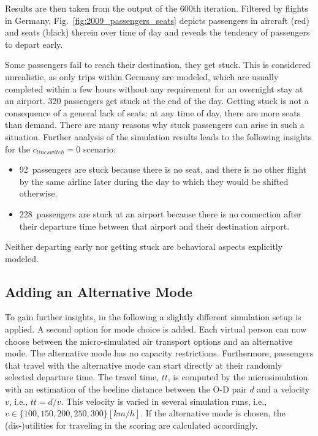 Results are then taken from the output of the 600th iteration. 
Filtered by flights in Germany, Fig.~\ref{fig:2009_passengers_seats} depicts passengers in aircraft (red) and seats (black) therein over time of day
and reveals the tendency of passengers to depart early. 

Some passengers fail to reach their destination, they get stuck.   
This is considered unrealistic, as only trips within Germany are modeled, which are usually completed within a few hours without any requirement for an overnight stay at an airport. 
320 passengers get stuck at the end of the day. 
Getting stuck is not a consequence of a general lack of seats: at any time of day, there are more seats than demand.  
There are many reasons why stuck passengers can arise in such a situation.
Further analysis of the simulation results leads to the following insights for the $c_{lineswitch} = 0$ scenario:
\begin{itemize}

\item 92~passengers are stuck because there is no seat, and there is no other flight by the same airline later during the day to which they would be shifted otherwise.

\item 228~passengers are stuck at an airport because there is no connection after their departure time 
	between that airport and their destination airport. 
\end{itemize}

Neither departing early nor getting stuck are behavioral aspects explicitly modeled.  

\subsection{Adding an Alternative Mode}

To gain further insights, in the following a slightly different simulation setup is applied. 
A second option for mode choice is added. 
Each virtual person can now choose between the micro-simulated air transport options and an alternative mode. 
The alternative mode has no capacity restrictions. 
Furthermore, passengers that travel with the alternative mode can start directly at their randomly selected departure time. 
The travel time, $tt$, is computed by the microsimulation with an estimation of the beeline distance between the O-D pair $d$ and a velocity $v$, i.e., $tt = d / v$.  
This velocity is varied in several simulation runs, i.e., $v \in \{100, 150, 200, 250, 300 \} [km/h]$. 
If the alternative mode is chosen, the (dis-)utilities for traveling in the scoring are calculated accordingly.  

